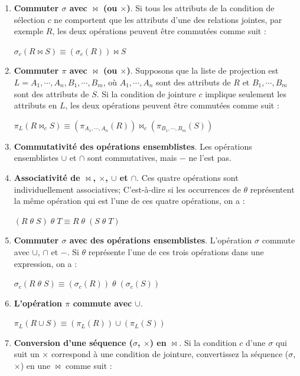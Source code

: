 \begin{enumerate}
 \item \textbf{Commuter $\sigma$ avec $\bowtie$ (ou $\times$)}. Si tous les attributs de la condition de sélection $c$ ne comportent que les attributs d'une des relations jointes, par exemple $R$, les deux opérations peuvent être commutées comme suit :
 
 $\sigma_c (R \bowtie S) \equiv (\sigma_c (R)) \bowtie S$
 
 \item \textbf{Commuter $\pi$ avec $\bowtie$ (ou $\times$)}. Supposons que la liste de projection est $L = {A_1, \cdots, A_n, B_1, \cdots, B_m}$, où $A_1, \cdots, A_n$ sont des attributs de $R$ et $B_1, \cdots, B_m$ sont des attributs de $S$. Si la condition de jointure $c$ implique seulement les attributs en $L$, les deux opérations peuvent être commutées comme suit :
 
 $\pi_L (R \bowtie_c S) \equiv (\pi_{A_1, \cdots, A_n} (R)) \bowtie_c (\pi_{B_1, \cdots ,B_m}(S))$
 
 \item \textbf{Commutativité des opérations ensemblistes}. Les opérations ensemblistes $\cup$ et $\cap$ sont commutatives, mais $-$ ne l'est pas.
 
 \item \textbf{Associativité de $\bowtie$, $\times$, $\cup$ et $\cap$}. Ces quatre opérations sont individuellement associatives; C'est-à-dire si les occurrences de $\theta$ représentent la même opération qui est l'une de ces quatre opérations, on a :
 
 $(R \; \theta \; S) \; \theta \; T \equiv R \; \theta \; (S \; \theta \; T)$
 
 \item \textbf{Commuter $\sigma$ avec des opérations ensemblistes}. L'opération $\sigma$ commute avec $\cup$, $\cap$ et $-$. Si $\theta$ représente l'une de ces trois opérations dans une expression, on a :
 
 $\sigma_c (R \; \theta \; S) \equiv (\sigma_c (R)) \; \theta \; (\sigma_c (S))$
 
 \item \textbf{L'opération $\pi$ commute avec $\cup$}.
 
 $\pi_L (R \cup S) \equiv (\pi_L (R)) \cup (\pi_L (S))$
 
 \item \textbf{Conversion d'une séquence ($\sigma$, $\times$) en $\bowtie$}. Si la condition $c$ d'une $\sigma$ qui suit un $\times$ correspond à une condition de jointure, convertissez la séquence ($\sigma$, $\times$) en une $\bowtie$ comme suit :
 

\end{enumerate}
